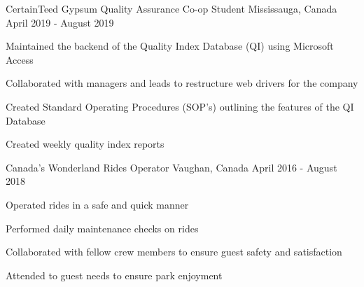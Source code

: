 


\begin{cventries}


\cventry
{CertainTeed Gypsum} %
{Quality Assurance Co-op Student} %
{Mississauga, Canada} %
{April 2019 - August 2019} %
{ %
\begin{cvitems}
\item {Maintained the backend of the Quality Index Database (QI) using Microsoft Access}
\item {Collaborated with managers and leads to restructure web drivers for the company}
\item {Created Standard Operating Procedures (SOP's) outlining the features of the QI Database }
\item {Created weekly quality index reports}
\end{cvitems}
}

\cventry
{Canada's Wonderland } %
{Rides Operator} %
{Vaughan, Canada} %
{April 2016 - August 2018} %
{ %
\begin{cvitems}
\item {Operated rides in a safe and quick manner}
\item {Performed daily maintenance checks on rides}
\item {Collaborated with fellow crew members to ensure guest safety and satisfaction}
\item {Attended to guest needs to ensure park enjoyment}
\end{cvitems}
}



\end{cventries}